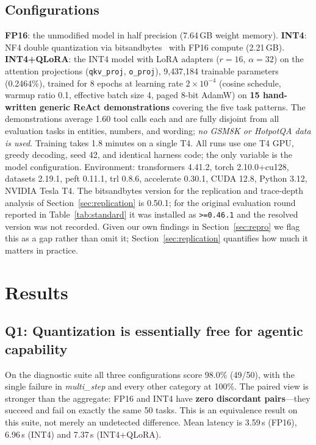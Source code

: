 \documentclass{article}
\begin{document}
\subsection{Configurations}
\label{sec:configs}
\textbf{FP16}: the unmodified model in half precision (7.64\,GB weight
memory).
\textbf{INT4}: NF4 double quantization via
bitsandbytes~\cite{dettmers2023qlora} with FP16 compute (2.21\,GB).
\textbf{INT4+QLoRA}: the INT4 model with LoRA adapters ($r{=}16$,
$\alpha{=}32$) on the attention projections (\texttt{qkv\_proj},
\texttt{o\_proj}), 9{,}437{,}184 trainable parameters (0.2464\%), trained
for 8 epochs at learning rate $2\times10^{-4}$ (cosine schedule, warmup
ratio 0.1, effective batch size 4, paged 8-bit AdamW) on \textbf{15
hand-written generic ReAct demonstrations} covering the five task
patterns. The demonstrations average 1.60 tool calls each and are fully
disjoint from all evaluation tasks in entities, numbers, and wording;
\emph{no GSM8K or HotpotQA data is used}. Training takes 1.8 minutes on a
single T4.
All runs use one T4 GPU, greedy decoding, seed 42, and identical harness
code; the only variable is the model configuration. Environment:
transformers 4.41.2, torch 2.10.0+cu128, datasets 2.19.1, peft 0.11.1,
trl 0.8.6, accelerate 0.30.1, CUDA 12.8, Python 3.12, NVIDIA Tesla T4.
The bitsandbytes version for the replication and trace-depth analysis of
Section~\ref{sec:replication} is 0.50.1; for the original evaluation round
reported in Table~\ref{tab:standard} it was
installed as \texttt{>=0.46.1} and the resolved version was not recorded.
Given our own findings in Section~\ref{sec:repro} we flag this as a gap
rather than omit it; Section~\ref{sec:replication} quantifies how much it
matters in practice.

\section{Results}

\subsection{Q1: Quantization is essentially free for agentic capability}
\label{sec:q1}

On the diagnostic suite all three configurations score 98.0\% (49/50), with
the single failure in \emph{multi\_step} and every other category at 100\%.
The paired view is stronger than the aggregate: FP16 and INT4 have
\textbf{zero discordant pairs}---they succeed and fail on exactly the same 50
tasks. This is an equivalence result on this suite, not merely an undetected
difference. Mean latency is 3.59\,s (FP16), 6.96\,s (INT4) and 7.37\,s
(INT4+QLoRA).
\end{document}
